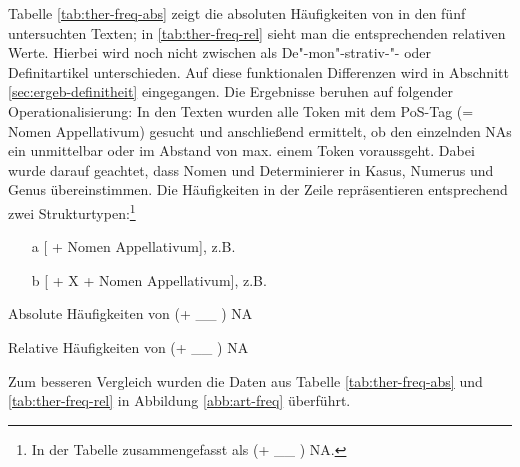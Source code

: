 Tabelle \ref{tab:ther-freq-abs} zeigt die absoluten Häufigkeiten von  in den fünf untersuchten Texten; in \ref{tab:ther-freq-rel} sieht man die entsprechenden relativen Werte. Hierbei wird noch nicht zwischen  als De"-mon"-strativ-"- oder Definitartikel unterschieden. Auf diese funktionalen Differenzen wird in Abschnitt \ref{sec:ergeb-definitheit} eingegangen. Die Ergebnisse beruhen auf folgender Operationalisierung: In den Texten wurden alle Token mit dem PoS-Tag  (= Nomen Appellativum) gesucht und anschließend ermittelt, ob den einzelnden NAs ein   unmittelbar oder im  Abstand von max. einem Token voraussgeht. Dabei wurde darauf geachtet, dass Nomen und Determinierer in Kasus, Numerus und Genus übereinstimmen. Die Häufigkeiten in der Zeile  repräsentieren entsprechend zwei Strukturtypen:\footnote{In der Tabelle zusammengefasst als  (+ \_\_ ) NA.}  
\begin{itemize}
\item[a] [\object{dër} + Nomen Appellativum], z.B. 
\item[b] [\object{dër} + X + Nomen Appellativum],
z.B.  %
\end{itemize}

\begin{table}
\centering

\caption{Absolute Häufigkeiten von  (+ \_\_ ) NA}
\label{tab:ther-freq-abs}
\end{table}

\begin{table}
\centering

\caption{Relative Häufigkeiten von  (+ \_\_ ) NA}
\label{tab:ther-freq-rel}
\end{table}

Zum besseren Vergleich wurden die Daten aus Tabelle \ref{tab:ther-freq-abs} und \ref{tab:ther-freq-rel} in Abbildung \ref{abb:art-freq} überführt.  

